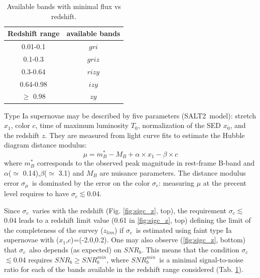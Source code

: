 \documentclass[\docopts]{\docclass}
\newcommand{\snrb}{{$SNR_b$}}
\newcommand{\snrbmin}{{$SNR_b^{min}$}}
\newcommand{\z}{{$z$}}
\newcommand{\bg}{{$g$}}
\newcommand{\br}{{$r$}}
\newcommand{\bi}{{$i$}}
\newcommand{\bz}{{$z$}}
\newcommand{\by}{{$y$}}
\newcommand{\salt}{SALT2}
\newcommand{\xnorm}{{$x_0$}}
\newcommand{\strech}{{$x_1$}}
\newcommand{\col}{{$c$}}
\newcommand{\daymax}{{$T_0$}}
\newcommand{\sigc}{{$\sigma_c$}}
\newcommand{\sigmu}{{$\sigma_\mu$}}
\newcommand{\zlim}{{$z_{lim}$}}
\begin{document}
\begin{table}[!htbp]
  \caption{Available bands with minimal flux vs redshift.}\label{tab:zfilters}
  \begin{center}
    \begin{tabular}{c|c}
      \hline
      \hline
      Redshift range & available bands \\
      \hline
      0.01-0.1 & \bg\br\bi\\
      0.1-0.3 & \bg\br\bi\bz \\
      0.3-0.64 & \br\bi\bz\by \\
      0.64-0.98 & \bi\bz\by \\
      $\geq$ 0.98 & \bz\by \\
      \hline
      \end{tabular}
  \end{center}
\end{table}

Type Ia supernovae may be described by five parameters (\salt~model): stretch\strech, color \col, time of maximum luminosity \daymax, normalization of the SED \xnorm, and the redshift \z.  They are measured from light curve fits to estimate the Hubble diagram distance modulus:
\begin{equation}
  \mu =m_B^*- M_B+\alpha \times x_1 -\beta \times c \label{eq:mu}
\end{equation}
where $m_B^*$ corresponds to the observed peak magnitude in rest-frame B-band and $\alpha$($\simeq$ 0.14),$\beta$($\simeq$ 3.1) and $M_B$ are nuisance parameters. The distance modulus error \sigmu~is dominated by the error on the color \sigc: measuring $\mu$ at the precent level  requires to have \sigc$\lesssim$0.04.

Since \sigc~varies with the redshift  (Fig. \ref{fig:sigc_z}, top), the requirement \sigc$\lesssim$0.04 leads to a redshift limit value (0.61 in \ref{fig:sigc_z}, top) defining the limit of the completeness of the survey (\zlim) if \sigc~is estimated using faint type Ia supernovae with (\strech,\col)=(-2.0,0.2). One may also observe (\ref{fig:sigc_z}, bottom) that \sigc~also depends (as expected) on \snrb. This means that the condition \sigc$\lesssim$0.04 requires \snrb$\geq$\snrbmin, where \snrbmin~is a minimal signal-to-noise ratio for each of the bands available in the redshift range considered (Tab. \ref{tab:zfilters}).
\end{document}
